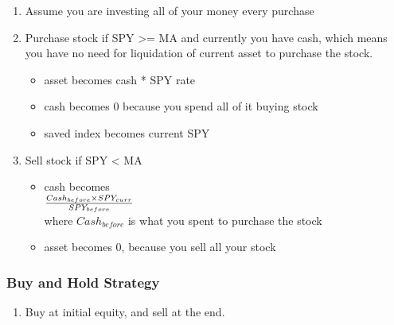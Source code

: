 \documentclass[11pt]{article}
\providecommand{\tightlist}{%
      \setlength{\itemsep}{0pt}\setlength{\parskip}{0pt}}
\begin{document}
\begin{enumerate}
\def\labelenumi{\arabic{enumi}.}
\item
  Assume you are investing all of your money every purchase
\item
  Purchase stock if SPY \textgreater{}= MA and currently you have cash,
  which means you have no need for liquidation of current asset to
  purchase the stock.

  \begin{itemize}
  \tightlist
  \item
    asset becomes cash * SPY rate
  \item
    cash becomes 0 because you spend all of it buying stock
  \item
    saved index becomes current SPY
  \end{itemize}
\item
  Sell stock if SPY \textless{} MA

  \begin{itemize}
  \tightlist
  \item
    cash becomes\\
    \({Cash_{before} \times SPY_{curr}} \over SPY_{before}\)\\
    where \(Cash_{before}\) is what you spent to purchase the stock\\
  \item
    asset becomes 0, because you sell all your stock
  \end{itemize}
\end{enumerate}

\subsubsection{Buy and Hold Strategy}\label{buy-and-hold-strategy}

\begin{enumerate}
\def\labelenumi{\arabic{enumi}.}
\tightlist
\item
  Buy at initial equity, and sell at the end.
\end{enumerate}
\end{document}

